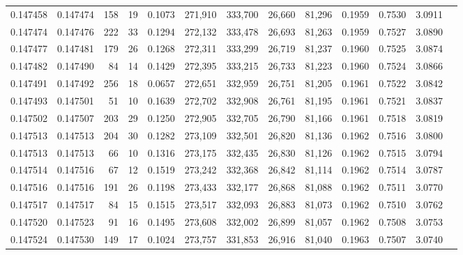 \begin{tabular}{rrrrrrrrrrrrr}
0.147458 & 0.147474 &   158 &  19 &                                     0.1073 & 271,910 & 333,700 &  26,660 &  81,296 & 0.1959 & 0.7530 & 3.0911 \\
0.147474 & 0.147476 &   222 &  33 &                                     0.1294 & 272,132 & 333,478 &  26,693 &  81,263 & 0.1959 & 0.7527 & 3.0890 \\
0.147477 & 0.147481 &   179 &  26 &                                     0.1268 & 272,311 & 333,299 &  26,719 &  81,237 & 0.1960 & 0.7525 & 3.0874 \\
0.147482 & 0.147490 &    84 &  14 &                                     0.1429 & 272,395 & 333,215 &  26,733 &  81,223 & 0.1960 & 0.7524 & 3.0866 \\
0.147491 & 0.147492 &   256 &  18 &                                     0.0657 & 272,651 & 332,959 &  26,751 &  81,205 & 0.1961 & 0.7522 & 3.0842 \\
0.147493 & 0.147501 &    51 &  10 &                                     0.1639 & 272,702 & 332,908 &  26,761 &  81,195 & 0.1961 & 0.7521 & 3.0837 \\
0.147502 & 0.147507 &   203 &  29 &                                     0.1250 & 272,905 & 332,705 &  26,790 &  81,166 & 0.1961 & 0.7518 & 3.0819 \\
0.147513 & 0.147513 &   204 &  30 &                                     0.1282 & 273,109 & 332,501 &  26,820 &  81,136 & 0.1962 & 0.7516 & 3.0800 \\
0.147513 & 0.147513 &    66 &  10 &                                     0.1316 & 273,175 & 332,435 &  26,830 &  81,126 & 0.1962 & 0.7515 & 3.0794 \\
0.147514 & 0.147516 &    67 &  12 &                                     0.1519 & 273,242 & 332,368 &  26,842 &  81,114 & 0.1962 & 0.7514 & 3.0787 \\
0.147516 & 0.147516 &   191 &  26 &                                     0.1198 & 273,433 & 332,177 &  26,868 &  81,088 & 0.1962 & 0.7511 & 3.0770 \\
0.147517 & 0.147517 &    84 &  15 &                                     0.1515 & 273,517 & 332,093 &  26,883 &  81,073 & 0.1962 & 0.7510 & 3.0762 \\
0.147520 & 0.147523 &    91 &  16 &                                     0.1495 & 273,608 & 332,002 &  26,899 &  81,057 & 0.1962 & 0.7508 & 3.0753 \\
0.147524 & 0.147530 &   149 &  17 &                                     0.1024 & 273,757 & 331,853 &  26,916 &  81,040 & 0.1963 & 0.7507 & 3.0740 \\

\end{tabular}
